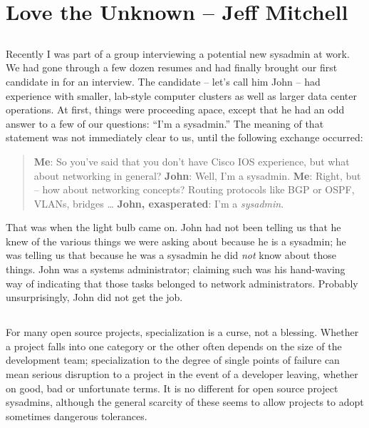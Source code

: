 \chapter{Love the Unknown -- Jeff Mitchell}

\section*{}Recently I was part of a group interviewing a potential new sysadmin at
work. We had gone through a few dozen resumes and had finally brought our first
candidate in for an interview. The candidate -- let’s call him John -- had
experience with smaller, lab-style computer clusters as well as larger data
center operations. At first, things were proceeding apace, except that he had an
odd answer to a few of our questions: ``I’m a sysadmin.''
The meaning of that statement was not immediately clear to us, until the
following exchange occurred:
\begin{quote}
\textbf{Me}: So you’ve said that you don’t have Cisco IOS experience, but what about
networking in general?\newline
\textbf{John}: Well, I’m a sysadmin.\newline
\textbf{Me}: Right, but -- how about networking concepts? Routing protocols like BGP or
OSPF, VLANs, bridges \dots \newline
\textbf{John, exasperated}: I’m a \emph{sysadmin}.
\end{quote}
That was when the light bulb came on. John had not been telling us that he knew
of the various things we were asking about because he is a sysadmin; he was
telling us that because he was a sysadmin he did \emph{not} know about those things.
John was a systems administrator; claiming such was his hand-waving way of
indicating that those tasks belonged to network administrators.
Probably unsurprisingly, John did not get the job.

\section*{}For many open source projects, specialization is a curse, not a blessing.
Whether a project falls into one category or the other often depends on the size
of the development team; specialization to the degree of single points of
failure can mean serious disruption to a project in the event of a developer
leaving, whether on good, bad or unfortunate terms. It is no different for open
source project sysadmins, although the general scarcity of these seems to allow
projects to adopt sometimes dangerous tolerances.

